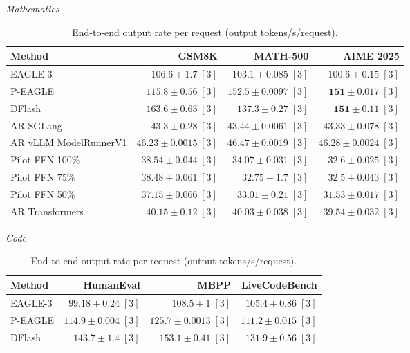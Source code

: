 \documentclass[conference,onecolumn]{IEEEtran}
\begin{document}
\begin{table}[!htp]
\centering\small
\setlength{\tabcolsep}{3pt}
\caption{End-to-end output rate per request (output tokens/s/request).}
\label{tab:appendix-metric-request-speed-none}
\textit{Mathematics}\par\smallskip
\begin{tabular}{@{}>{\raggedright\arraybackslash}p{3.7cm}rrr@{}}
\toprule
Method & GSM8K & MATH-500 & AIME 2025 \\
\midrule
EAGLE-3 & \(106.6 \pm 1.7\;[3]\) & \(103.1 \pm 0.085\;[3]\) & \(100.6 \pm 0.15\;[3]\) \\
P-EAGLE & \(115.8 \pm 0.56\;[3]\) & \(\mathbf{152.5} \pm 0.0097\;[3]\) & \(\mathbf{151} \pm 0.017\;[3]\) \\
DFlash & \(\mathbf{163.6} \pm 0.63\;[3]\) & \(137.3 \pm 0.27\;[3]\) & \(\mathbf{151} \pm 0.11\;[3]\) \\
AR \textperiodcentered{} SGLang & \(43.3 \pm 0.28\;[3]\) & \(43.44 \pm 0.0061\;[3]\) & \(43.33 \pm 0.078\;[3]\) \\
AR \textperiodcentered{} vLLM ModelRunnerV1 & \(46.23 \pm 0.0015\;[3]\) & \(46.47 \pm 0.0019\;[3]\) & \(46.28 \pm 0.0024\;[3]\) \\
Pilot FFN 100\% & \(38.54 \pm 0.044\;[3]\) & \(34.07 \pm 0.031\;[3]\) & \(32.6 \pm 0.025\;[3]\) \\
Pilot FFN 75\% & \(38.48 \pm 0.061\;[3]\) & \(32.75 \pm 1.7\;[3]\) & \(32.5 \pm 0.043\;[3]\) \\
Pilot FFN 50\% & \(37.15 \pm 0.066\;[3]\) & \(33.01 \pm 0.21\;[3]\) & \(31.53 \pm 0.017\;[3]\) \\
AR \textperiodcentered{} Transformers & \(40.15 \pm 0.12\;[3]\) & \(40.03 \pm 0.038\;[3]\) & \(39.54 \pm 0.032\;[3]\) \\
\bottomrule
\end{tabular}\par\medskip
\textit{Code}\par\smallskip
\begin{tabular}{@{}>{\raggedright\arraybackslash}p{3.7cm}rrr@{}}
\toprule
Method & HumanEval & MBPP & LiveCodeBench \\
\midrule
EAGLE-3 & \(99.18 \pm 0.24\;[3]\) & \(108.5 \pm 1\;[3]\) & \(105.4 \pm 0.86\;[3]\) \\
P-EAGLE & \(114.9 \pm 0.004\;[3]\) & \(125.7 \pm 0.0013\;[3]\) & \(111.2 \pm 0.015\;[3]\) \\
DFlash & \(\mathbf{143.7} \pm 1.4\;[3]\) & \(\mathbf{153.1} \pm 0.41\;[3]\) & \(\mathbf{131.9} \pm 0.56\;[3]\) \\

\end{tabular}
\end{table}
\end{document}
